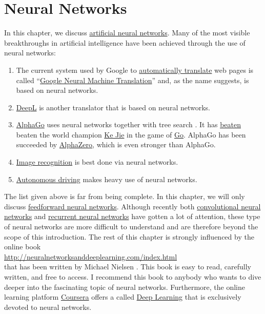 \chapter{Neural Networks}
In this chapter, we discuss \href{https://en.wikipedia.org/wiki/Artificial_neural_network}{artificial neural networks}.
Many of the most visible breakthroughs in artificial intelligence have been achieved through the use of neural
networks: 
\begin{enumerate}
\item The current system used by Google to \href{https://translate.google.com}{automatically translate} web
      pages is called 
      ``\href{https://en.wikipedia.org/wiki/Google_Neural_Machine_Translation}{Google Neural Machine Translation}''
      and, as the name suggests, is based on neural networks. 
\item \href{https://www.deepl.com/translator}{DeepL} is another translator that is based on neural networks.      
\item \href{https://de.wikipedia.org/wiki/AlphaGo}{AlphaGo} uses neural networks together with tree search
      \cite{silver:2016}.  It has \href{https://en.wikipedia.org/wiki/AlphaGo_versus_Ke_Jie}{beaten} 
      beaten the world champion \href{https://en.wikipedia.org/wiki/Ke_Jie}{Ke Jie} in the game of
      \href{https://en.wikipedia.org/wiki/Go_(game)}{Go}. AlphaGo has been succeeded by
      \href{https://en.wikipedia.org/wiki/AlphaZero}{AlphaZero}, which is even stronger than AlphaGo.
\item \href{https://www.tensorflow.org/tutorials/image_recognition}{Image recognition} is best done via neural networks.
\item \href{https://en.wikipedia.org/wiki/Autonomous_car}{Autonomous driving} makes heavy use of neural networks.
\end{enumerate}
The list given above is far from being complete.  In this chapter, we will only discuss 
\href{https://en.wikipedia.org/wiki/Feedforward_neural_network}{feedforward neural networks}.  Although recently both 
\href{https://en.wikipedia.org/wiki/Convolutional_neural_network}{convolutional neural networks} and
\href{https://en.wikipedia.org/wiki/Recurrent_neural_network}{recurrent neural networks} have gotten a lot of
attention, these type of neural networks are more difficult to understand and are therefore beyond the scope of this
introduction.  The rest of this chapter is strongly influenced by the online book 
\\[0.2cm]
\hspace*{1.3cm}
\href{http://neuralnetworksanddeeplearning.com/index.html}{http://neuralnetworksanddeeplearning.com/index.html}
\\[0.2cm]
that has been written by Michael Nielsen \cite{nielsen:2015}.  This book is easy to read, carefully written, and
free to access.  I recommend this book to anybody who wants to dive deeper into the fascinating topic of neural
networks.  Furthermore, the online learning platform \href{https://www.coursera.org/}{Coursera} offers a
 called \href{https://www.coursera.org/specializations/deep-learning}{Deep Learning} that
is exclusively devoted to neural networks.

